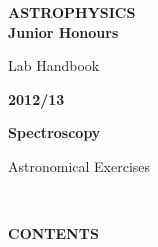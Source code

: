 \documentclass[12pt]{article}
\begin{document}
\pagestyle{empty}
\centering
\vspace*{2cm}

{\Huge\bf ASTROPHYSICS \\ Junior Honours
\vspace*{3mm}

 Lab Handbook}
\vspace*{1cm}

{\Huge\bf 2012/13}
\vspace*{1cm}

\vspace*{3cm}

{\huge\bf Spectroscopy

Astronomical Exercises


}

~
\newpage

\centering
{\Large\bf CONTENTS}
\vspace*{4cm}

\raggedright
\end{document}
